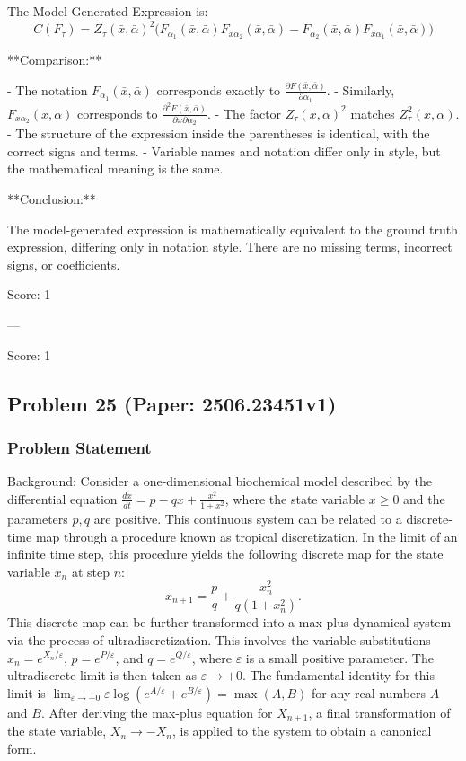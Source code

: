 \documentclass[10pt]{article}
\begin{document}
The Model-Generated Expression is:
\[
C(F_\tau) = Z_\tau(\bar x,\bar\alpha)^2 \bigl( F_{\alpha_1}(\bar x,\bar\alpha) F_{x\alpha_2}(\bar x,\bar\alpha) - F_{\alpha_2}(\bar x,\bar\alpha) F_{x\alpha_1}(\bar x,\bar\alpha) \bigr)
\]

**Comparison:**

- The notation $F_{\alpha_1}(\bar x,\bar\alpha)$ corresponds exactly to $\frac{\partial F(\bar x, \bar \alpha)}{\partial \alpha_1}$.
- Similarly, $F_{x\alpha_2}(\bar x,\bar\alpha)$ corresponds to $\frac{\partial^2 F(\bar x, \bar \alpha)}{\partial x \partial \alpha_2}$.
- The factor $Z_\tau(\bar x,\bar\alpha)^2$ matches $Z_{\tau}^2(\bar x, \bar \alpha)$.
- The structure of the expression inside the parentheses is identical, with the correct signs and terms.
- Variable names and notation differ only in style, but the mathematical meaning is the same.

**Conclusion:**

The model-generated expression is mathematically equivalent to the ground truth expression, differing only in notation style. There are no missing terms, incorrect signs, or coefficients.

Score: 1

---

Score: 1

\newpage
\subsection*{Problem 25 (Paper: 2506.23451v1)}
\subsubsection*{Problem Statement}
Background:
Consider a one-dimensional biochemical model described by the differential equation $\frac{dx}{dt} = p-qx+\frac{x^2}{1+x^2}$, where the state variable $x \ge 0$ and the parameters $p, q$ are positive. This continuous system can be related to a discrete-time map through a procedure known as tropical discretization. In the limit of an infinite time step, this procedure yields the following discrete map for the state variable $x_n$ at step $n$:
\[
x_{n+1}=\frac{p}{q}+\frac{x_n^2}{q(1+x_n^2)}.
\]
This discrete map can be further transformed into a max-plus dynamical system via the process of ultradiscretization. This involves the variable substitutions $x_n=e^{X_n/\varepsilon}$, $p=e^{P/\varepsilon}$, and $q=e^{Q/\varepsilon}$, where $\varepsilon$ is a small positive parameter. The ultradiscrete limit is then taken as $\varepsilon \to +0$. The fundamental identity for this limit is $\lim_{\varepsilon \to +0}\varepsilon\log(e^{A/\varepsilon}+e^{B/\varepsilon})=\max(A,B)$ for any real numbers $A$ and $B$. After deriving the max-plus equation for $X_{n+1}$, a final transformation of the state variable, $X_n \to -X_n$, is applied to the system to obtain a canonical form.
\end{document}
